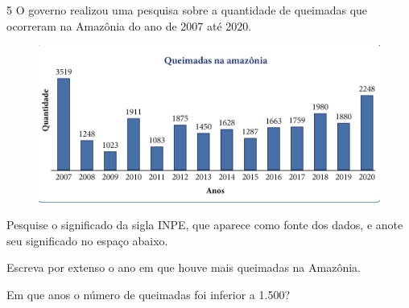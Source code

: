 

\num{5} O governo realizou uma pesquisa sobre a quantidade de queimadas
que ocorreram na Amazônia do ano de 2007 até 2020.

\begin{figure}[htpb!]
\centering
\includegraphics[width=.9\textwidth]{../ilustracoes/MAT5/SAEB_5ANO_MAT_figura105.png}
\end{figure}

\pagebreak

\begin{escolha}
\item
  Pesquise o significado da sigla INPE, que aparece como fonte dos dados,
  e anote seu significado no espaço abaixo.

\item {}

\item
  Escreva por extenso o ano em que houve mais queimadas na Amazônia.
\item{}

\item
  Em que anos o número de queimadas foi inferior a 1.500?
\item{}
\end{escolha}

